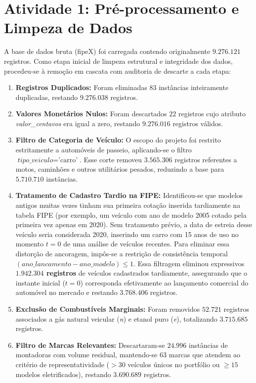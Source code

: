 \section{Atividade 1: Pré-processamento e Limpeza de Dados}

A base de dados bruta (fipeX) foi carregada contendo originalmente $9.276.121$ registros. Como etapa inicial de limpeza estrutural e integridade dos dados, procedeu-se à remoção em cascata com auditoria de descarte a cada etapa:
\begin{enumerate}
    \item \textbf{Registros Duplicados:} Foram eliminadas $83$ instâncias inteiramente duplicadas, restando $9.276.038$ registros.
    \item \textbf{Valores Monetários Nulos:} Foram descartados $22$ registros cujo atributo \textit{valor\_centavos} era igual a zero, restando $9.276.016$ registros válidos.
    \item \textbf{Filtro de Categoria de Veículo:} O escopo do projeto foi restrito estritamente a automóveis de passeio, aplicando-se o filtro $\textit{tipo\_veiculo} = \text{'carro'}$. Esse corte removeu $3.565.306$ registros referentes a motos, caminhões e outros utilitários pesados, reduzindo a base para $5.710.710$ instâncias.
    \item \textbf{Tratamento de Cadastro Tardio na FIPE:} Identificou-se que modelos antigos muitas vezes tinham sua primeira cotação inserida tardiamente na tabela FIPE (por exemplo, um veículo com ano de modelo 2005 cotado pela primeira vez apenas em 2020). Sem tratamento prévio, a data de estreia desse veículo seria considerada 2020, inserindo um carro com 15 anos de uso no momento $t=0$ de uma análise de veículos recentes. Para eliminar essa distorção de ancoragem, impôs-se a restrição de consistência temporal $(\textit{ano\_lancamento} - \textit{ano\_modelo}) \le 1$. Essa filtragem eliminou expressivos \textbf{$1.942.304$ registros} de veículos cadastrados tardiamente, assegurando que o instante inicial ($t=0$) corresponda efetivamente ao lançamento comercial do automóvel no mercado e restando $3.768.406$ registros.
    \item \textbf{Exclusão de Combustíveis Marginais:} Foram removidos $52.721$ registros associados a gás natural veicular (\textit{n}) e etanol puro (\textit{e}), totalizando $3.715.685$ registros.
    \item \textbf{Filtro de Marcas Relevantes:} Descartaram-se $24.996$ instâncias de montadoras com volume residual, mantendo-se $63$ marcas que atendem ao critério de representatividade ($> 30$ veículos únicos no portfólio ou $\ge 15$ modelos eletrificados), restando $3.690.689$ registros.
\end{enumerate}

